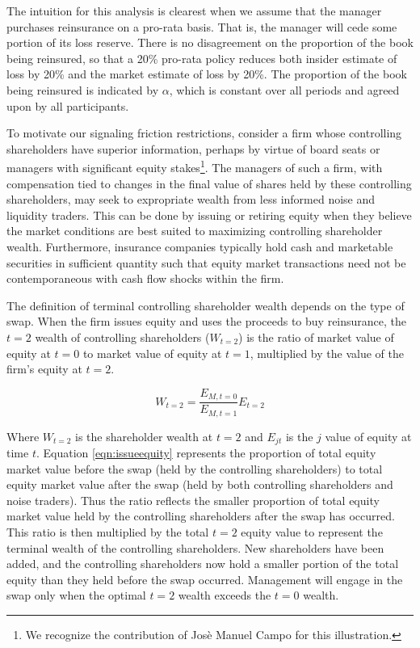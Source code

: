 The intuition for this analysis is clearest when we assume that the manager purchases reinsurance on a pro-rata basis.  That is, the manager will cede some portion of its loss reserve.  There is no disagreement on the proportion of the book being reinsured, so that a 20\% pro-rata policy reduces both insider estimate of loss by 20\% and the market estimate of loss by 20\%.  The proportion of the book being reinsured is indicated by $\alpha$, which is constant over all periods and agreed upon by all participants.

To motivate our signaling friction restrictions, consider a firm whose controlling shareholders have superior information, perhaps by virtue of board seats or managers with significant equity stakes\footnote{We recognize the contribution of Jos\`{e} Manuel Campo for this illustration.}.  The managers of such a firm, with compensation tied to changes in the final value of shares held by these controlling shareholders, may seek to expropriate wealth from less informed noise and liquidity traders. This can be done by issuing or retiring equity when they believe the market conditions are best suited to maximizing controlling shareholder wealth. Furthermore, insurance companies typically hold cash and marketable securities in sufficient quantity such that equity market transactions need not be contemporaneous with cash flow shocks within the firm.

The definition of terminal controlling shareholder wealth depends on the type of swap.  When the firm issues equity and uses the proceeds to buy reinsurance, the $t=2$ wealth of controlling shareholders ($W_{t=2}$) is the ratio of market value of equity at $t=0$ to market value of equity at $t=1$, multiplied by the value of the firm's equity at $t=2$.

\begin{equation}\label{eqn:issueequity}
W_{t=2}=\frac{E_{M,t=0}}{E_{M,t=1}}E_{t=2}
\end{equation}

Where $W_{t=2}$ is the shareholder wealth at $t=2$ and $E_{jt}$ is the $j$ value of equity at time $t$. Equation \ref{eqn:issueequity} represents the proportion of total equity market value before the swap (held by the controlling shareholders) to total equity market value after the swap (held by both controlling shareholders and noise traders). Thus the ratio reflects the smaller proportion of total equity market value held by the controlling shareholders after the swap has occurred.  This ratio is then multiplied by the total $t=2$ equity value to represent the terminal wealth of the controlling shareholders.  New shareholders have been added, and the controlling shareholders now hold a smaller portion of the total equity than they held before the swap occurred.  Management will engage in the swap only when the optimal $t=2$ wealth exceeds the $t=0$ wealth.

